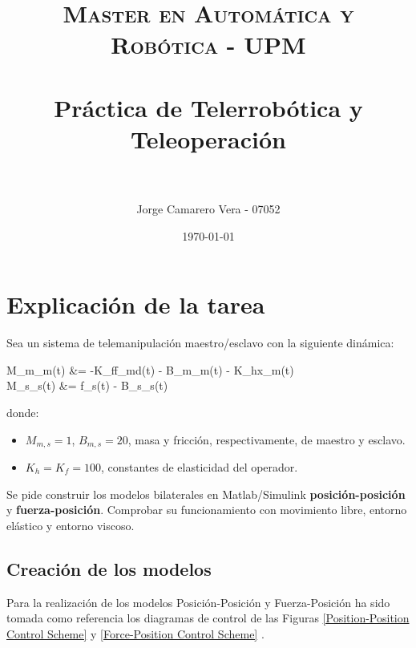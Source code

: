 \documentclass[a4paper, fontsize=11pt]{scrartcl} %
\title{	
	\normalfont \normalsize 
	\textsc{Master en Automática y Robótica - UPM} \\ [25pt] %
	\horrule{0.5pt} \\[0.4cm] %
	\huge Práctica de Telerrobótica y Teleoperación \\ %
	\horrule{2pt} \\[0.5cm] %
}
\author{Jorge Camarero Vera - 07052} %
\date{\normalsize\today} %
\numberwithin{equation}{section} %
\numberwithin{figure}{section} %
\numberwithin{table}{section} %
\newenvironment{myalign}{\par\nobreak\large\noindent\align}{\endalign} %
\begin{document}
	\maketitle
	
	\section{Explicación de la tarea}
	
	Sea un sistema de telemanipulación maestro/esclavo con la siguiente dinámica:
	\begin{myalign}
		\begin{split}
			M_m_m(t) &= -K_ff_{md}(t) - B_m_m(t) - K_hx_m(t)\\
			M_s_s(t) &= f_s(t) - B_s_s(t)
		\end{split}
	\label{Model Equations}
	\end{myalign}
	donde:
	\begin{itemize}
		\item $M_{m,s} = 1$, $B_{m,s}=20$, masa y fricción, respectivamente, de maestro y esclavo.
		\item $K_h=K_f = 100$, constantes de elasticidad del operador.
	\end{itemize}
	
	Se pide construir los modelos bilaterales en Matlab/Simulink \textbf{posición-posición} y \textbf{fuerza-posición}. Comprobar su funcionamiento con movimiento libre, entorno elástico y entorno viscoso.

	
	\subsection{Creación de los modelos}\label{Models Creation}
	
	Para la realización de los modelos Posición-Posición y Fuerza-Posición ha sido tomada como referencia los diagramas de control de las Figuras \ref{Position-Position Control Scheme} y \ref{Force-Position Control Scheme} \cite{Bilateral}.\\
	
\end{document}
